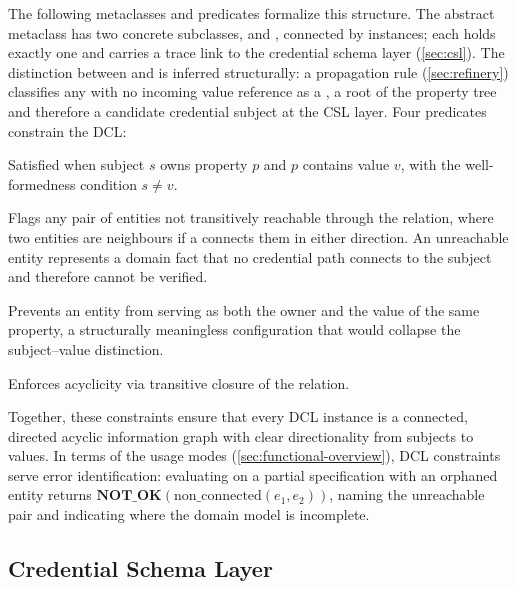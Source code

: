 The following metaclasses and predicates formalize this structure. The abstract metaclass  has two concrete subclasses,  and , connected by  instances; each  holds exactly one  and carries a trace link to the credential schema layer (\autoref{sec:csl}). The distinction between  and  is inferred structurally: a propagation rule (\autoref{sec:refinery}) classifies any  with no incoming value reference as a , a root of the property tree and therefore a candidate credential subject at the \ac{CSL} layer. Four predicates constrain the \ac{DCL}:

\begin{description}
\tightlist
\item[statement(s, p, v): ternary predicate]
Satisfied when subject \(s\) owns property \(p\) and \(p\) contains value \(v\), with the well-formedness condition \(s \neq v\).
\item[non\_connected(e1, e2): error predicate]
Flags any pair of entities not transitively reachable through the  relation, where two entities are neighbours if a  connects them in either direction. An unreachable entity represents a domain fact that no credential path connects to the subject and therefore cannot be verified.
\item[no\_self\_loop: propagation rule]
Prevents an entity from serving as both the owner and the value of the same property, a structurally meaningless configuration that would collapse the subject--value distinction.
\item[cyclic: error predicate]
Enforces acyclicity via transitive closure of the  relation.
\end{description}

Together, these constraints ensure that every \ac{DCL} instance is a connected, directed acyclic information graph with clear directionality from subjects to values. In terms of the usage modes (\autoref{sec:functional-overview}), \ac{DCL} constraints serve error identification: evaluating  on a partial specification with an orphaned entity returns \(\textbf{NOT\_OK}(\text{non\_connected}(e_1, e_2))\), naming the unreachable pair and indicating where the domain model is incomplete.

\subsection{Credential Schema Layer}\label{sec:csl}


